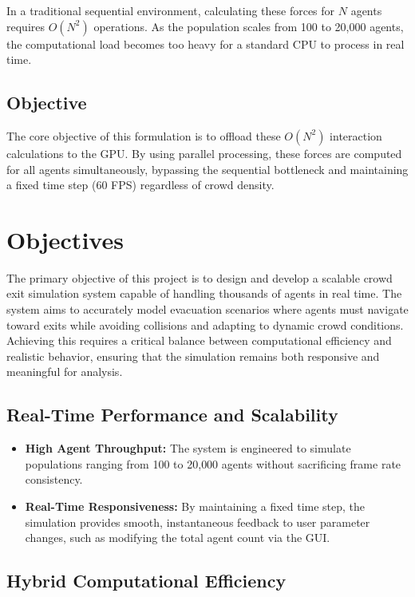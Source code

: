 \documentclass[12pt,a4paper]{report}
\begin{document}
In a traditional sequential environment, calculating these forces for $N$ agents requires $O(N^2)$ operations. As the population scales from 100 to 20{,}000 agents, the computational load becomes too heavy for a standard CPU to process in real time.

\section{Objective}

The core objective of this formulation is to offload these $O(N^2)$ interaction calculations to the GPU. By using parallel processing, these forces are computed for all agents simultaneously, bypassing the sequential bottleneck and maintaining a fixed time step (60 FPS) regardless of crowd density.

\chapter{Objectives}

The primary objective of this project is to design and develop a scalable crowd exit simulation system capable of handling thousands of agents in real time. The system aims to accurately model evacuation scenarios where agents must navigate toward exits while avoiding collisions and adapting to dynamic crowd conditions. Achieving this requires a critical balance between computational efficiency and realistic behavior, ensuring that the simulation remains both responsive and meaningful for analysis.

\section{Real-Time Performance and Scalability}

\begin{itemize}
    \item \textbf{High Agent Throughput:} The system is engineered to simulate populations ranging from 100 to 20{,}000 agents without sacrificing frame rate consistency.
    
    \item \textbf{Real-Time Responsiveness:} By maintaining a fixed time step, the simulation provides smooth, instantaneous feedback to user parameter changes, such as modifying the total agent count via the GUI.
\end{itemize}

\section{Hybrid Computational Efficiency}
\end{document}
